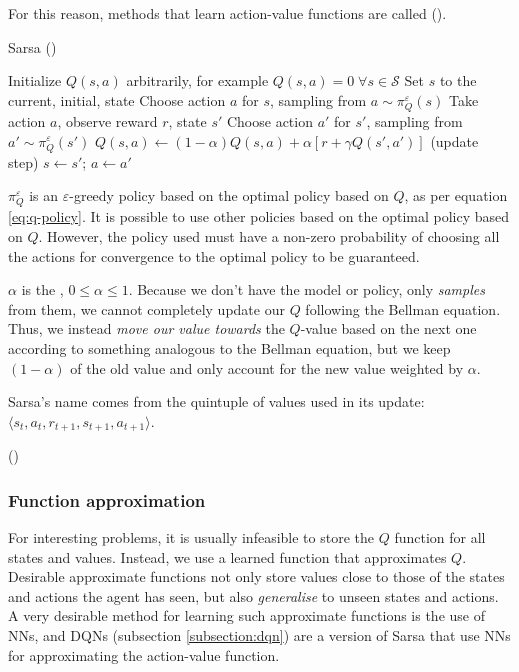 For this reason, methods that learn action-value functions are called
 (\cite[Subsection~21.3.2]{russell2009aima}).

\begin{algorithm}[h]
\caption{Sarsa (\cite[Section~6.4]{sutton1998introduction})}
\label{alg:sarsa}
\begin{algorithmic}
\State Initialize $Q(s, a)$ arbitrarily, for example $Q(s, a)=0 \; \forall
s\in\mathcal{S}$
  \State Set $s$ to the current, initial, state
  \State Choose action $a$ for $s$, sampling from $a \sim \pi^\varepsilon_Q(s)$
    \State Take action $a$, observe reward $r$, state $s'$
    \State Choose action $a'$ for $s'$, sampling from $a' \sim \pi^\varepsilon_Q(s')$
    \State $Q(s, a) \gets (1-\alpha)Q(s,a) +
      \alpha \left[r + \gamma Q(s', a') \right]$ (update step)
    \State $s \gets s'$; $a \gets a'$
\EndRepeatComment
\end{algorithmic}
\end{algorithm}

$\pi^\varepsilon_Q$ is an $\varepsilon$-greedy policy based on
the optimal policy based on $Q$, as per equation \ref{eq:q-policy}. It is
possible to use other policies based on the optimal policy based on $Q$. However,
the policy used must have a non-zero probability of choosing all the actions for
convergence to the optimal policy to be guaranteed.

$\alpha$ is the , $0\leq\alpha\leq 1$. Because we
don't have the model or policy, only \emph{samples} from them, we cannot
completely update our $Q$ following the Bellman equation. Thus, we instead
\emph{move our value towards} the $Q$-value based on the next one according to
something analogous to the Bellman equation, but we keep $(1-\alpha)$ of the old
value and only account for the new value weighted by $\alpha$.

Sarsa's name comes from the quintuple of values used in its update:
$\langle s_t, a_t, r_{t+1}, s_{t+1}, a_{t+1}\rangle$.

(\cite[Section~6.4]{sutton1998introduction})

\subsubsection{Function approximation}
For interesting problems, it is usually infeasible to store the $Q$ function for
all states and values. Instead, we use a learned function that approximates $Q$.
Desirable approximate functions not only store values close to those of the states and
actions the agent has seen, but also \emph{generalise} to unseen states and
actions. A very desirable method for learning such approximate functions is the
use of \acfp{NN}, and \acfp{DQN} (subsection \ref{subsection:dqn}) are a version
of Sarsa that use \acp{NN} for approximating the action-value function. 

